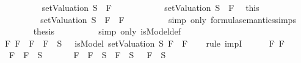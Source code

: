 \begin{isabellebody}
\ \ \ \ \ \ \ \ \isamarkupfalse%
\ {\isachardoublequoteopen}{\isacharparenleft}setValuation\ S{\isacharparenright}\ {\isasymTurnstile}\ F{}{\isachardoublequoteclose}\isanewline
\ \ \ \ \ \ \ \ \ \ \isamarkupfalse%
\ {\isacartoucheopen}{\isacharparenleft}setValuation\ S{\isacharparenright}\ {\isasymTurnstile}\ F{}{\isacartoucheclose}\ \isamarkupfalse%
\ this\ \isanewline
\ \ \ \ \ \ \isamarkupfalse%
\isanewline
\ \ \ \ \ \ \isamarkupfalse%
\ \isamarkupfalse%
\ {\isachardoublequoteopen}{\isacharparenleft}setValuation\ S{\isacharparenright}\ {\isasymTurnstile}\ {\isacharparenleft}F{}\ \isactrlbold {\isasymrightarrow}\ F{}{\isacharparenright}{\isachardoublequoteclose}\isanewline
\ \ \ \ \ \ \ \ \isamarkupfalse%
\ {\isacharparenleft}simp\ only{\isacharcolon}\ formula{\isacharunderscore}semantics{\isachardot}simps{\isacharparenleft}{}{\isacharparenright}{\isacharparenright}\isanewline
\ \ \ \ \ \ \isamarkupfalse%
\ {\isacharquery}thesis\isanewline
\ \ \ \ \ \ \ \ \isamarkupfalse%
\ {\isacharparenleft}simp\ only{\isacharcolon}\ isModel{\isacharunderscore}def{\isacharparenright}\isanewline
\ \ \ \ \isamarkupfalse%
\isanewline
\ \ \isamarkupfalse%
\isanewline
{}\isamarkupfalse%
\isanewline
\ \ \isamarkupfalse%
\ {\isachardoublequoteopen}{\isasymAnd}F{}\ F{}{\isachardot}\ \isactrlbold {\isasymnot}\ {\isacharparenleft}F{}\ \isactrlbold {\isasymrightarrow}\ F{}{\isacharparenright}\ {\isasymin}\ S\ {\isasymlongrightarrow}\ {\isasymnot}\ isModel\ {\isacharparenleft}setValuation\ S{\isacharparenright}\ {\isacharparenleft}F{}\ \isactrlbold {\isasymrightarrow}\ F{}{\isacharparenright}{\isachardoublequoteclose}\isanewline
\ \ \isamarkupfalse%
\ {\isacharparenleft}rule\ impI{\isacharparenright}\isanewline
\ \ \ \ \isamarkupfalse%
\ F{}\ F{}\isanewline
\ \ \ \ \isamarkupfalse%
\ {\isachardoublequoteopen}\isactrlbold {\isasymnot}\ {\isacharparenleft}F{}\ \isactrlbold {\isasymrightarrow}\ F{}{\isacharparenright}\ {\isasymin}\ S{\isachardoublequoteclose}\isanewline
\ \ \ \ \isamarkupfalse%
\ {\isachardoublequoteopen}\isactrlbold {\isasymnot}\ {\isacharparenleft}F{}\ \isactrlbold {\isasymrightarrow}\ F{}{\isacharparenright}\ {\isasymin}\ S\ {\isasymlongrightarrow}\ F{}\ {\isasymin}\ S\ {\isasymand}\ \isactrlbold {\isasymnot}\ F{}\ {\isasymin}\ S{\isachardoublequoteclose}\isanewline

\end{isabellebody}
